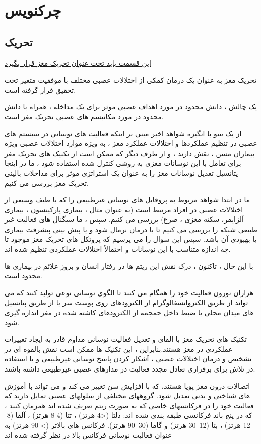 \section*{چرکنویس}
\subsection*{تحریک}




\underline{
این قسمت باید تحت عنوان تحریک مغز قرار بگیرد
}

تحریک مغز به عنوان یک درمان کمکی از اختلالات عصبی مختلف با موفقیت متغیر تحت تحقیق قرار گرفته است.

یک چالش ، دانش محدود در مورد اهداف عصبی موثر برای یک مداخله ، همراه با دانش محدود در مورد مکانیسم های عصبی تحریک مغز است.

از یک سو با انگیزه شواهد اخیر مبنی بر اینکه فعالیت های نوسانی در سیستم های عصبی در تنظیم عملکردها و اختلالات عملکرد مغز ، به ویژه موارد اختلالات عصبی ویژه بیماران مسن ، نقش دارند ،
و از طرف دیگر که ممکن است از تکنیک های تحریک مغز برای تعامل با این نوسانات مغزی به روشی کنترل شده استفاده شود ، ما در اینجا پتانسیل تعدیل نوسانات مغز را به عنوان یک استراتژی موثر برای مداخلات بالینی تحریک مغز بررسی می کنیم.

ما در ابتدا شواهد مربوط به پروفایل های نوسانی غیرطبیعی را که با طیف وسیعی از اختلالات عصبی در افراد مرتبط است (به عنوان مثال ، بیماری پارکینسون ، بیماری آلزایمر، سکته مغزی ، صرع) بررسی می کنیم.
سپس ، ما سیگنال های فعالیت غیر طبیعی شبکه را بررسی می کنیم تا با درمان نرمال شود و یا پیش بینی پیشرفت بیماری یا بهبودی آن باشد.
سپس این سوال را می پرسیم که پروتکل های  تحریک مغز موجود تا چه اندازه متناسب با این نوسانات و احتمالاً اختلالات عملکردی تنظیم شده اند.

با این حال ، تاکنون ، درک نقش این ریتم ها در رفتار انسان و بروز علائم در بیماری ها محدود است.


هزاران نورون فعالیت خود را همگام می کنند تا الگوی نوسانی نوعی تولید کنند که می تواند از طریق الکتروانسفالوگرام از الکترودهای روی پوست سر یا از طریق پتانسیل های میدان محلی  یا ضبط داخل جمجمه از الکترودهای کاشته شده در مغز اندازه گیری شود.

تکنیک های تحریک مغز با القای و تعدیل فعالیت نوسانی مداوم قادر به ایجاد تغییرات عملکردی در مغز هستند.بنابراین ، این تکنیک ها ممکن است نقش بالقوه ای در تشخیص و درمان اختلالات عصبی ، آشکار کردن پاسخ نوسانی غیرطبیعی و یا استفاده در تلاش برای برقراری تعادل مجدد فعالیت در مدارهای عصبی غیرطبیعی داشته باشند.


اتصالات درون مغز پویا هستند، که با افزایش سن تغییر می کند و می تواند با آموزش های شناختی و بدنی تعدیل شود.
گروههای مختلفی از سلولهای عصبی تمایل دارند که فعالیت خود را در فرکانسهای خاصی که به صورت ریتم تعریف شده اند همزمان کنند ، که در پنج باند فرکانسی طبقه بندی شده اند: دلتا (<4 هرتز) ، تتا (4-8 هرتز) ، آلفا (8-12 هرتز) ، بتا (12–30 هرتز) و گاما (30–90 هرتز). فرکانس های بالاتر (> 90 هرتز) به عنوان فعالیت نوسانی فرکانس بالا در نظر گرفته شده اند

